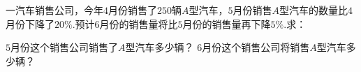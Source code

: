一汽车销售公司，今年$4$月份销售了$250$辆$A$型汽车，$5$月份销售$A$型汽车的数量比$4$月份下降了$20\%$.预计$6$月份的销售量将比$5$月份的销售量再下降$5\%$.求：
\begin{subquestions}
\subquestion $5$月份这个销售公司销售了$A$型汽车多少辆？
\subquestion $6$月份这个销售公司将销售$A$型汽车多少辆？
\end{subquestions}